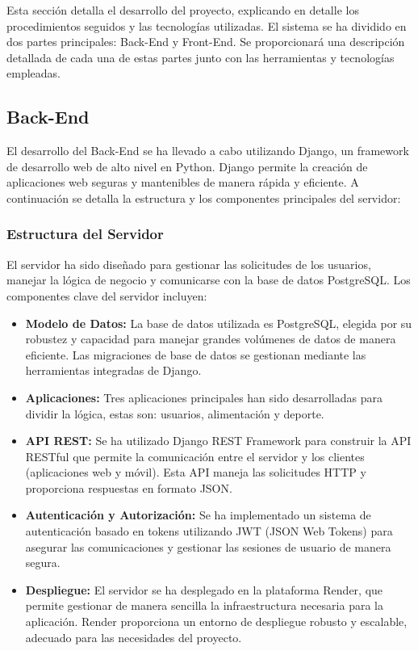 Esta sección detalla el desarrollo del proyecto, explicando en detalle los procedimientos seguidos y las tecnologías utilizadas. El sistema se ha dividido en dos partes principales: Back-End y Front-End. Se proporcionará una descripción detallada de cada una de estas partes junto con las herramientas y tecnologías empleadas. 

\subsection{Back-End}

El desarrollo del Back-End se ha llevado a cabo utilizando Django, un framework de desarrollo web de alto nivel en Python. Django permite la creación de aplicaciones web seguras y mantenibles de manera rápida y eficiente. A continuación se detalla la estructura y los componentes principales del servidor:

\subsubsection{Estructura del Servidor}

El servidor ha sido diseñado para gestionar las solicitudes de los usuarios, manejar la lógica de negocio y comunicarse con la base de datos PostgreSQL. Los componentes clave del servidor incluyen:

\begin{itemize}
    \item \textbf{Modelo de Datos:} La base de datos utilizada es PostgreSQL, elegida por su robustez y capacidad para manejar grandes volúmenes de datos de manera eficiente. Las migraciones de base de datos se gestionan mediante las herramientas integradas de Django.
    
    \item \textbf{Aplicaciones:} Tres aplicaciones principales han sido desarrolladas para dividir la lógica, estas son: usuarios, alimentación y deporte.
    
    \item \textbf{API REST:} Se ha utilizado Django REST Framework para construir la API RESTful que permite la comunicación entre el servidor y los clientes (aplicaciones web y móvil). Esta API maneja las solicitudes HTTP y proporciona respuestas en formato JSON.
    
    \item \textbf{Autenticación y Autorización:} Se ha implementado un sistema de autenticación basado en tokens utilizando JWT (JSON Web Tokens) para asegurar las comunicaciones y gestionar las sesiones de usuario de manera segura.
    
    \item \textbf{Despliegue:} El servidor se ha desplegado en la plataforma Render, que permite gestionar de manera sencilla la infraestructura necesaria para la aplicación. Render proporciona un entorno de despliegue robusto y escalable, adecuado para las necesidades del proyecto.
    
\end{itemize}

